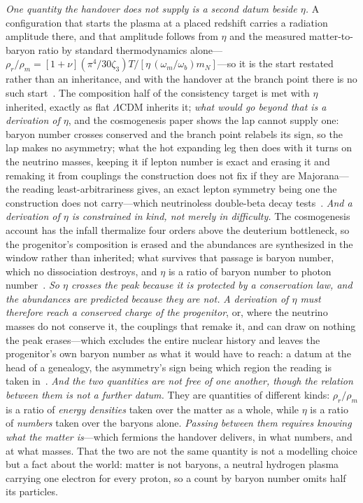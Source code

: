 \documentclass[11pt,a4paper]{article}
\theoremstyle{plain}
\theoremstyle{definition}
\theoremstyle{remark}
\begin{document}
\emph{One quantity the handover does not supply is a second datum beside $\eta$.} A configuration that starts
the plasma at a placed redshift carries a radiation amplitude there, and that amplitude follows from $\eta$
and the measured matter-to-baryon ratio by standard thermodynamics alone---$\rho_r/\rho_m=[1+\nu](\pi^4/30\zeta_3)T
/[\eta\,(\omega_m/\omega_b)m_N]$---so it is the start restated rather than an inheritance, and with the
handover at the branch point there is no such start~\cite{JanzenCRcosmology}. The composition half of the consistency target is met with $\eta$
inherited, exactly as flat $\Lambda$CDM inherits it; \emph{what would go beyond that is a derivation of $\eta$}, and the cosmogenesis paper shows the lap cannot supply one: baryon number crosses conserved and the branch point relabels its sign, so the lap makes no asymmetry; what the hot expanding leg then does with it turns on the neutrino masses, keeping it if lepton number is exact and erasing it and remaking it from couplings the construction does not fix if they are Majorana---the reading least-arbitrariness gives, an exact lepton symmetry being one the construction does not carry---which neutrinoless double-beta decay tests~\cite{JanzenCosmogenesis}. \emph{And a derivation of $\eta$ is constrained in kind, not merely in difficulty.} The cosmogenesis account has the infall thermalize four orders above the deuterium bottleneck, so the progenitor's composition is erased and the abundances are synthesized in the window rather than inherited; what survives that passage is baryon number, which no dissociation destroys, and $\eta$ is a ratio of baryon number to photon number~\cite{JanzenCosmogenesis}. \emph{So $\eta$ crosses the peak because it is protected by a conservation law, and the abundances are predicted because they are not.} \emph{A derivation of $\eta$ must therefore reach a conserved charge of the progenitor}, or, where the neutrino masses do not conserve it, the couplings that remake it, and can draw on nothing the peak erases---which excludes the entire nuclear history and leaves the progenitor's own baryon number as what it would have to reach: a datum at the head of a genealogy, the asymmetry's sign being which region the reading is taken in~\cite{JanzenCosmogenesis}. \emph{And the two quantities are not free of one another, though the relation between them is not a further datum.}
They are quantities of different kinds: $\rho_r/\rho_m$ is a ratio of \emph{energy densities} taken over the
matter as a whole, while $\eta$ is a ratio of \emph{numbers} taken over the baryons alone. \emph{Passing between
them requires knowing what the matter is}---which fermions the handover delivers, in what numbers, and at what
masses. That the two are not the same quantity is not a modelling choice but a fact about the world: matter is
not baryons, a neutral hydrogen plasma carrying one electron for every proton, so a count by baryon number
omits half its particles.
\end{document}
